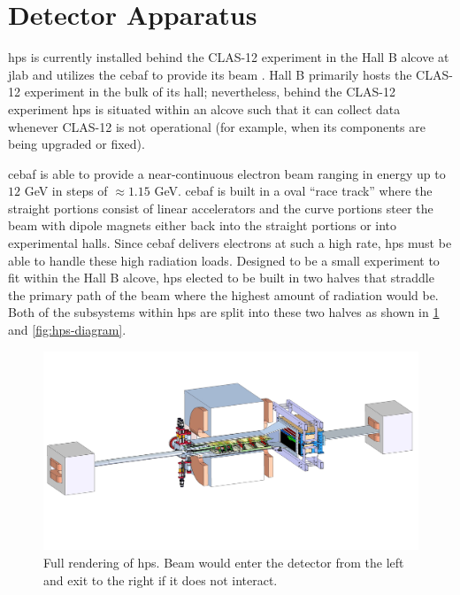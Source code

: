 \section{Detector Apparatus}
\ac{hps} is currently installed behind the CLAS-12 experiment in the Hall B
alcove at \ac{jlab} and utilizes the \ac{cebaf} to provide its beam
\cite{mrsolt-thesis-2020,skmccarty-thesis-2020}.
Hall B primarily hosts the CLAS-12 experiment in the bulk of its hall; nevertheless,
behind the CLAS-12 experiment \ac{hps} is situated
within an alcove such that it can collect data whenever CLAS-12 is not operational (for example,
when its components are being upgraded or fixed).

\ac{cebaf} \cite{cebaf-12GeV-2012,cebaf-opportunities-2012,cebaf-2013} is able to
provide a near-continuous electron beam ranging in energy up to $12$ GeV in steps
of $\approx 1.15$ GeV. \ac{cebaf} is built in a oval ``race track'' where the straight
portions consist of linear accelerators and the curve portions steer the beam with
dipole magnets either back into the straight portions or into experimental halls.
Since \ac{cebaf} delivers electrons at such a high rate, \ac{hps} must be able to
handle these high radiation loads. Designed to be a small experiment to fit within
the Hall B alcove, \ac{hps} elected to be built in two halves that straddle the primary
path of the beam where the highest amount of radiation would be. Both of the subsystems
within \ac{hps} are split into these two halves as shown in \cref{fig:hps-full-render}
and \cref{fig:hps-diagram}.

\begin{figure}
	\centering
	\includegraphics[trim={15cm 10cm 10cm 5cm},clip,width=\textwidth]{figures/hps/experiment/hps_full_render.jpg}
	\caption{
		Full rendering of \ac{hps}.
		Beam would enter the detector from the left and exit to the right if it does not interact.
	}
	\label{fig:hps-full-render}
\end{figure}

